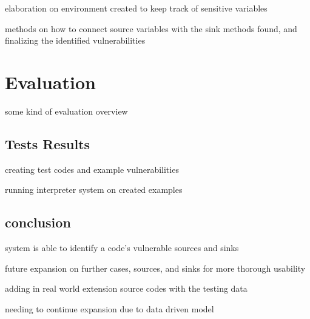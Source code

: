 \documentclass[jou,apacite]{apa6}
\begin{document}
		elaboration on environment created to keep track of sensitive variables

		methods on how to connect source variables with the sink methods found, and finalizing the identified vulnerabilities



\section{Evaluation}

	some kind of evaluation overview

	\subsection{Tests Results}

		creating test codes and example vulnerabilities

		running interpreter system on created examples

	\subsection{conclusion}

		system is able to identify a code's vulnerable sources and sinks
		
		future expansion on further cases, sources, and sinks for more thorough usability

		adding in real world extension source codes with the testing data		

		needing to continue expansion due to data driven model


\end{document}
